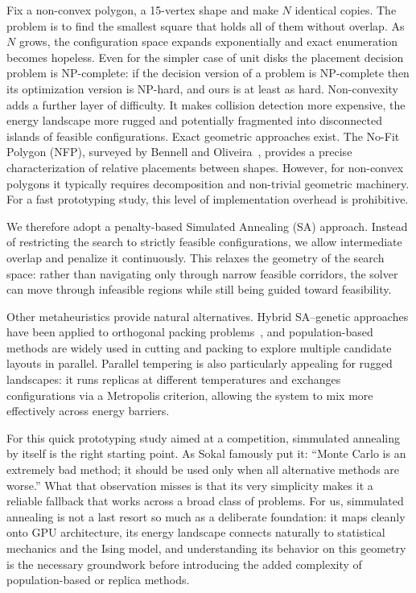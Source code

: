 \documentclass[10pt]{article}
\begin{document}
Fix a non-convex polygon, a 15-vertex shape and make $N$ identical copies.
The problem is to find the smallest square that holds all of them
without overlap. As $N$ grows, the configuration space expands
exponentially and exact enumeration becomes hopeless.
Even for the
simpler case of unit disks the placement decision problem is
NP-complete: if the decision version of a problem
is NP-complete then its optimization version is NP-hard, and ours is
at least as hard.
Non-convexity adds a further layer of difficulty.
It makes collision detection more expensive, the energy landscape more
rugged and potentially fragmented into disconnected islands of 
feasible configurations.
Exact geometric approaches exist. The No-Fit Polygon (NFP), surveyed
by Bennell and Oliveira~\cite{bennell2008}, provides a precise
characterization of relative placements between shapes. However,
for non-convex polygons it typically requires decomposition and
non-trivial geometric machinery. For a fast prototyping study,
this level of implementation overhead is prohibitive.

We therefore adopt a penalty-based Simulated Annealing (SA) approach.
Instead of restricting the search to strictly feasible configurations,
we allow intermediate overlap and penalize it continuously. This
relaxes the geometry of the search space: rather than navigating only
through narrow feasible corridors, the solver can move through
infeasible regions while still being guided toward feasibility.

Other metaheuristics provide natural alternatives. Hybrid SA--genetic
approaches have been applied to orthogonal packing problems~\cite{leung2003},
and population-based methods are widely used in cutting and packing
to explore multiple candidate layouts in parallel. Parallel tempering
is also particularly appealing for rugged landscapes: it runs replicas
at different temperatures and exchanges configurations via a Metropolis
criterion, allowing the system to mix more effectively across energy
barriers.

For this quick prototyping study aimed at a competition,
 simmulated annealing by itself is the right starting point. As Sokal
famously put it: ``Monte Carlo is an extremely bad method; it should be
used only when all alternative methods are worse.'' What that observation
misses is that its very simplicity makes it a reliable fallback that
works across a broad class of problems.
For us, simmulated annealing is not a last resort so much as a deliberate foundation: it
maps cleanly onto GPU architecture, its energy landscape connects
naturally to statistical mechanics and the Ising model, and understanding
its behavior on this geometry is the necessary groundwork before
introducing the added complexity of population-based or replica methods.
\end{document}

